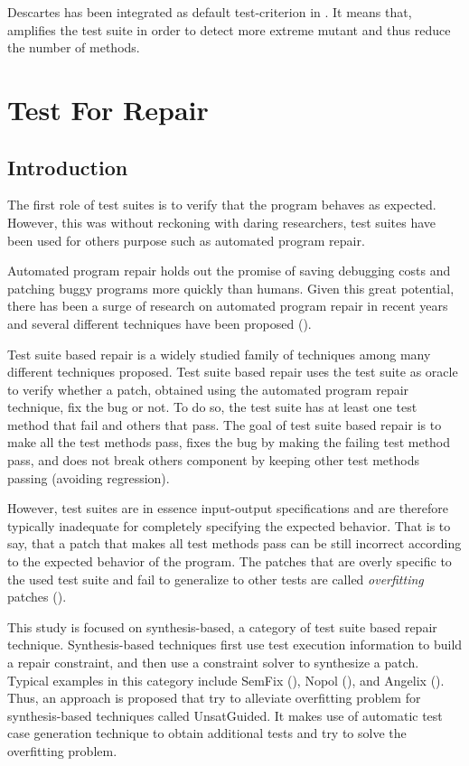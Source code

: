 Descartes has been integrated as default test-criterion in \dspot.
It means that, \dspot amplifies the test suite in order to detect more extreme mutant and thus reduce the number of \pseudotested methods.

\section{Test For Repair}
\label{sec:transversal-contributions:test-for-repair}


\subsection{Introduction}
\label{subsec:transversal-contributions:test-for-repair:introduction}

The first role of test suites is to verify that the program behaves as expected.
However, this was without reckoning with daring researchers, test suites have been used for others purpose such as automated program repair.

Automated program repair holds out the promise of saving debugging costs and patching buggy programs more quickly than humans. 
Given this great potential, there has been a surge of research on automated program repair in recent years and several different techniques have been proposed (\cite{genprog,semfix,nopol,tsepei,long2017automatic}).

Test suite based repair is a widely studied family of techniques among many different techniques proposed.
Test suite based repair uses the test suite as oracle to verify whether a patch, obtained using the automated program repair technique, fix the bug or not.
To do so, the test suite has at least one test method that fail and others that pass.
The goal of test suite based repair is to make all the test methods pass, \ie fixes the bug by making the failing test method pass, and does not break others component by keeping other test methods passing (avoiding regression).

However, test suites are in essence input-output specifications and are therefore typically inadequate for completely specifying the expected behavior.
That is to say, that a patch that makes all test methods pass can be still incorrect according to the expected behavior of the program.
The patches that are overly specific to the used test suite and fail to generalize to other tests are called \emph{overfitting} patches (\cite{smith2015cure}).

This study is focused on synthesis-based, a category of test suite based repair technique.
Synthesis-based techniques first use test execution information to build a repair constraint, and then use a constraint solver to synthesize a patch. 
Typical examples in this category include SemFix (\cite{semfix}), Nopol (\cite{nopol}), and Angelix (\cite{Mechtaev:2016:ASM:2884781.2884807}).
Thus, an approach is proposed that try to alleviate overfitting problem for synthesis-based techniques called UnsatGuided.
It makes use of automatic test case generation technique to obtain additional tests and try to solve the overfitting problem.

